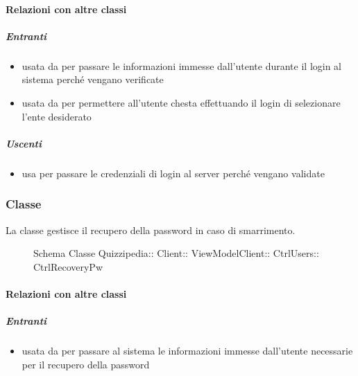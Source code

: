 \paragraph{Relazioni con altre classi}
\subparagraph{Entranti}
\begin{itemize}
\item usata da  per passare le informazioni immesse dall'utente durante il login al sistema perché vengano verificate
\item usata da  per permettere all'utente chesta effettuando il login di selezionare l'ente desiderato
\end{itemize}
\subparagraph{Uscenti}
\begin{itemize}
\item usa  per passare le credenziali di login al server perché vengano validate
\end{itemize}
\subsubsection{Classe }
La classe gestisce il recupero della password in caso di smarrimento.
\begin{figure}[H]
\centering
\noindent{}
\caption[Schema Classe CtrlRecoveryPw]{Schema Classe Quizzipedia:: Client:: ViewModelClient:: CtrlUsers:: CtrlRecoveryPw}
\end{figure}
\paragraph{Relazioni con altre classi}
\subparagraph{Entranti}
\begin{itemize}
\item usata da  per passare al sistema le informazioni immesse dall'utente necessarie per il recupero della password
\end{itemize}
